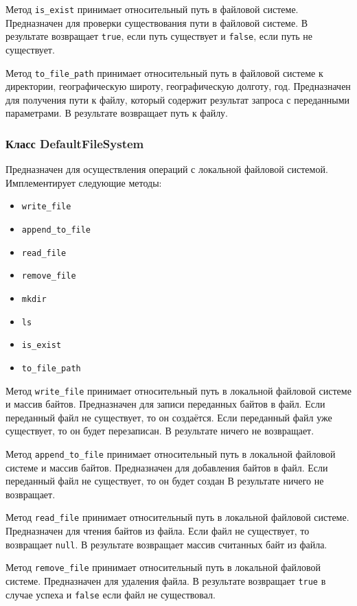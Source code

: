 Метод \texttt{is\_exist} принимает относительный путь в файловой системе.
Предназначен для проверки существования пути в файловой системе.
В результате возвращает \texttt{true}, если путь существует и \texttt{false}, если путь не существует.

Метод \texttt{to\_file\_path} принимает относительный путь в файловой системе к директории, географическую широту, географическую долготу, год.
Предназначен для получения пути к файлу, который содержит результат запроса с переданными параметрами.
В результате возвращает путь к файлу.


\subsubsection{Класс DefaultFileSystem}
Предназначен для осуществления операций с локальной файловой системой.
Имплементирует следующие методы:
\begin{itemize}
    \item \texttt{write\_file}
    \item \texttt{append\_to\_file}
    \item \texttt{read\_file}
    \item \texttt{remove\_file}
    \item \texttt{mkdir}
    \item \texttt{ls}
    \item \texttt{is\_exist}
    \item \texttt{to\_file\_path}
\end{itemize}

Метод \texttt{write\_file} принимает относительный путь в локальной файловой системе и массив байтов.
Предназначен для записи переданных байтов в файл.
Если переданный файл не существует, то он создаётся.
Если переданный файл уже существует, то он будет перезаписан.
В результате ничего не возвращает.

Метод \texttt{append\_to\_file} принимает относительный путь в локальной файловой системе и массив байтов.
Предназначен для добавления байтов в файл.
Если переданный файл не существует, то он будет создан
В результате ничего не возвращает.

Метод \texttt{read\_file} принимает относительный путь в локальной файловой системе.
Предназначен для чтения байтов из файла.
Если файл не существует, то возвращает \texttt{null}.
В результате возвращает массив считанных байт из файла.

Метод \texttt{remove\_file} принимает относительный путь в локальной файловой системе.
Предназначен для удаления файла.
В результате возвращает \texttt{true} в случае успеха и \texttt{false} если файл не существовал.

